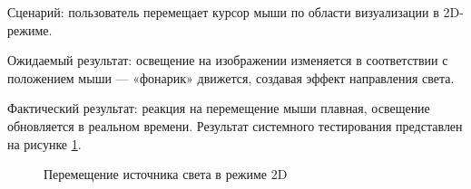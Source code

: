 Сценарий: пользователь перемещает курсор мыши по области визуализации в 2D-режиме.

Ожидаемый результат: освещение на изображении изменяется в соответствии с положением мыши — «фонарик» движется, создавая эффект направления света.

Фактический результат: реакция на перемещение мыши плавная, освещение обновляется в реальном времени.
\newpage
Результат системного тестирования представлен на рисунке \ref{testfon:image}.

\begin{figure}[H]
	\caption{Перемещение источника света в режиме 2D}
	\label{testfon:image}
\end{figure}

\begin{comment}
На рисунке \ref{main:image} представлена главная страница сайта «Русатом – Аддитивные технологии».
\newpage %
\begin{figure}[H] %
\center{\texttt{[image: main1]}}
\center{\texttt{[image: main2]}}
\center{\texttt{[image: main3]}}
\caption{Главная страница сайта «Русатом – Аддитивные технологии»}
\label{main:image}
\end{figure}

На рисунке \ref{menu:image} представлен динамический вывод заголовков, включающий в себя искомые фразы при поиске фраз.

\begin{figure}[ht]
\center{\texttt{[image: menu]}}
\caption{Динамический вывод заголовков}
\label{menu:image}
\end{figure}

На рисунке \ref{enter:image} представлен ввод данных для публикации новости.

\begin{figure}[ht]
\center{\texttt{[image: enter]}}
\caption{Ввод данных для публикации очень-очень длинной, интересной и полезной новости}
\label{enter:image}
\end{figure}
\end{comment}